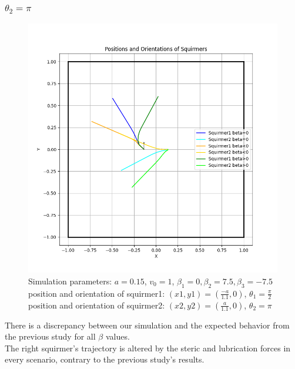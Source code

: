 \documentclass{article}
\begin{document}
\subsubsection{$\theta_2 = \pi$}
\begin{figure}[h]
   \centering
   \includegraphics[width=1\textwidth]{graphs/simulations/twosquirmerinter/sq2.pi.png}
   \caption{\footnotesize Simulation parameters: $a=0.15$, $v_0=1$, $\beta_1=0, \beta_2=7.5, \beta_3=-7.5$\\
   position and orientation of squirmer1: $(x1,y1)=(\frac{-a}{1.1},0)$, $\theta_1=\frac{\pi}{2}$\\
   position and orientation of squirmer2: $(x2,y2)=(\frac{a}{1.1},0)$, $\theta_2=\pi$}
\end{figure}
There is a discrepancy between our simulation and the expected behavior from the previous study for all $\beta$ values.\\
The right squirmer's trajectory is altered by the steric and lubrication forces in every scenario, 
contrary to the previous study's results.

\newpage
\end{document}
